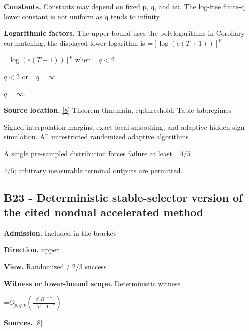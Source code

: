\documentclass[10pt,a4paper]{article}
\newcommand{\AtlasMath}[1]{\par\begingroup\centering\setbox0=\hbox{$\displaystyle #1$}\ifdim\wd0>1.4\linewidth\typeout{ATLAS WIDE FORMULA: \the\wd0}\fi\ifdim\wd0>\linewidth\resizebox{\linewidth}{!}{\box0}\else\box0\fi\par\endgroup}
\newcommand{\AtlasInlineMath}[1]{\begingroup\setbox0=\hbox{$#1$}\ifdim\wd0>.4\linewidth\endgroup\AtlasMath{#1}\else\endgroup$#1$\fi}
\begin{document}
\textbf{Constants.} Constants may depend on fixed p, q, and nu. The log-free finite-q lower constant is not uniform as q tends to infinity.



\textbf{Logarithmic factors.} The upper bound uses the polylogarithms in Corollary cor:matching; the displayed lower logarithm is \AtlasInlineMath{[\log(e(T+1))]^\nu} when \AtlasInlineMath{q<2} or \AtlasInlineMath{q=\infty}.



\textbf{Source location.} \href{https://github.com/WU-Wendao/Colombo/blob/main/colombo_sensorium/Complexity_altas/data/sources/colombo/B1/manuscript.pdf}{[8]} Theorem thm:main, eq:threshold; Table tab:regimes



Signed interpolation margins, exact-local smoothing, and adaptive hidden-sign simulation. All unrestricted randomized adaptive algorithms



A single pre-sampled distribution forces failure at least \AtlasInlineMath{4/5}; arbitrary measurable terminal outputs are permitted.



\subsection{B23 - Deterministic stable-selector version of the cited nondual accelerated method}


\textbf{Admission.} Included in the bracket



\textbf{Direction.} upper



\textbf{View.} Randomized / 2/3 success



\textbf{Witness or lower-bound scope.} Deterministic witness



\AtlasMath{\widetilde O_{p,q,\nu}\!\left(\frac{\beta_\nu R^{1+\nu}}{(T+1)^a}\right)}


\textbf{Sources.} \href{https://github.com/WU-Wendao/Colombo/blob/main/colombo_sensorium/Complexity_altas/data/sources/colombo/B1/manuscript.pdf}{[8]}
\end{document}
